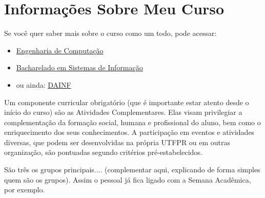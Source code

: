 \documentclass[a4paper,12pt,openany]{article}
\begin{document}


\newpage
\section{Informações Sobre Meu Curso}
\label{sec:InfoCurso}
Se você quer saber mais sobre o curso como um todo, pode acessar:

\begin{itemize}
\item \href{http://www.utfpr.edu.br/estrutura-universitaria/pro-reitorias/prograd/catalogo-de-cursos-da-utfpr/curitiba/engenharia-de-computacao}{Engenharia de Computação}

\item \href{http://www.utfpr.edu.br/estrutura-universitaria/pro-reitorias/prograd/catalogo-de-cursos-da-utfpr/curitiba/sistemas-de-informacao}{Bacharelado em Sistemas de Informação}

\item ou ainda: \href{http://www2.dainf.ct.utfpr.edu.br/}{DAINF}

\end{itemize}

Um componente curricular obrigatório (que é importante estar atento desde o início do curso) são as Atividades Complementares. Elas visam privilegiar a complementação da formação social, humana e profissional do aluno, bem como o enriquecimento dos seus conhecimentos. A participação em eventos e atividades diversas, que podem ser desenvolvidas na própria UTFPR ou em outras organização, são pontuadas segundo critérios pré-estabelecidos. 

São três os grupos principais.... (complementar aqui, explicando de forma simples quem são os grupos). Assim o pessoal já fica ligado com a Semana Acadêmica, por exemplo.


\newpage
\end{document}
